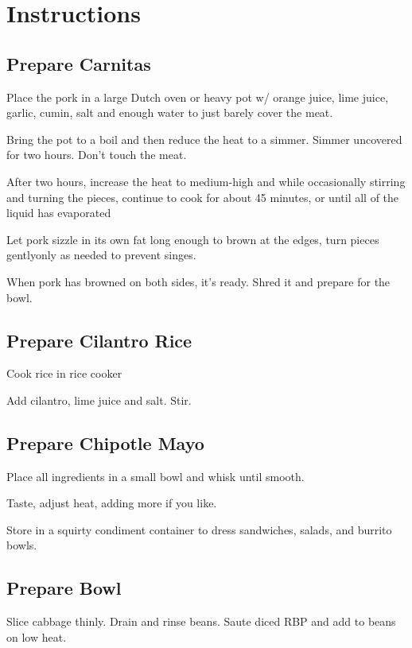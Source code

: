 \documentclass[ansiapaper,10pt,english]{sphinxmanual}
\begin{document}
\section{Instructions}
\label{\detokenize{Burrito_Bowl:instructions}}

\subsection{Prepare Carnitas}
\label{\detokenize{Burrito_Bowl:prepare-carnitas}}
Place the pork in a large Dutch oven or heavy pot w/ orange juice, lime juice, garlic, cumin, salt and enough water to just barely cover the meat.

Bring the pot to a boil and then reduce the heat to a simmer. Simmer uncovered for two hours. Don’t touch the meat.

After two hours, increase the heat to medium-high and while occasionally stirring and turning the pieces, continue to cook for about 45 minutes, or until all of the liquid has evaporated

Let pork sizzle in its own fat long enough to brown at the edges, turn pieces gentlyonly as needed to prevent singes.

When pork has browned on both sides, it’s ready. Shred it and prepare for the bowl.


\subsection{Prepare Cilantro Rice}
\label{\detokenize{Burrito_Bowl:prepare-cilantro-rice}}
Cook rice in rice cooker

Add cilantro, lime juice and salt. Stir.


\subsection{Prepare Chipotle Mayo}
\label{\detokenize{Burrito_Bowl:prepare-chipotle-mayo}}
Place all ingredients in a small bowl and whisk until smooth.

Taste, adjust heat, adding more if you like.

Store in a squirty condiment container to dress sandwiches, salads, and burrito bowls.


\subsection{Prepare Bowl}
\label{\detokenize{Burrito_Bowl:prepare-bowl}}
Slice cabbage thinly.  Drain and rinse beans.  Saute diced RBP and add to beans on low heat.
\end{document}

